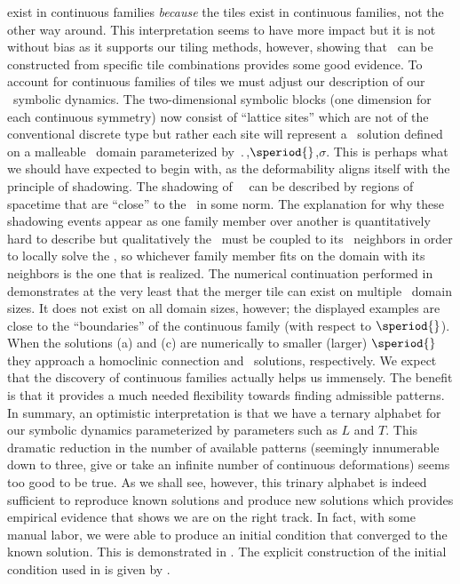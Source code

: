 exist in continuous families \textit{because} the tiles exist
in continuous families, not the other way around.
This interpretation
seems to have more impact but it
is not without bias as it supports our tiling
methods, however,
showing that \twots\ can be constructed from
specific tile combinations
provides some good evidence.
To account for continuous families of tiles we must
adjust our description of our \spt\ symbolic dynamics.
The two-dimensional symbolic blocks (one dimension for each continuous
symmetry) now consist of ``lattice sites''  which are not of the conventional
discrete type but rather each site will represent a \twot\ solution defined
on a malleable \spt\ domain parameterized by $\period{}$,$\speriod{}$,$\sigma$.
This is perhaps what we should have expected to begin with, as the deformability
aligns itself with the principle of shadowing. The shadowing of \spt\ \twots\
can be described by regions of spacetime that are ``close'' to the \twot\ in some norm.
The explanation for why these shadowing events
appear as one family member over another
is quantitatively hard to describe but
qualitatively the \twot\ must be
coupled to its \spt\ neighbors in order to locally solve the \KSe, so
whichever family member fits on the domain with its neighbors is the
one that is realized.
The numerical continuation performed in  demonstrates
at the very least that the merger tile can exist on multiple \spt\ domain sizes.
It does not exist on all domain sizes, however; the displayed examples are close
to the ``boundaries'' of the continuous family (with respect to $\speriod{}$).
When the solutions (a) and (c) are numerically to smaller (larger) $\speriod{}$
they approach a homoclinic connection and \reqv\ solutions, respectively.
We expect that the discovery of continuous
families actually helps us immensely.
The benefit is that it provides a much needed
flexibility towards finding admissible patterns.
In summary, an optimistic interpretation
is that we have a ternary alphabet for our
symbolic dynamics parameterized by parameters
such as $L$ and $T$.
This dramatic reduction in the number of available patterns (seemingly
innumerable down to three, give or take an infinite number
of continuous deformations) seems too good to be true.
As we shall see, however, this trinary
alphabet is indeed sufficient to reproduce
known solutions and produce new solutions
which provides empirical evidence
that shows we are on the right track.
In fact, with some manual labor, we
were able to produce an initial condition that
converged to the known solution. This is demonstrated
in .
The explicit construction of the
initial condition used in 
is given by .


